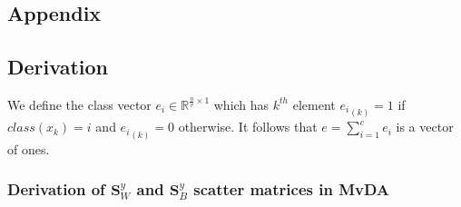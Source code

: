 
\cleardoublepage
{}
\ohead[]{\pagemark}
\begin{appendix}
\chapter{Appendix}

\section{Derivation}\label{app:derivation}

We define the class vector $e_i \in \mathbb{R}^{\frac{n}{v}\times 1}$ which has $k^{th}$ element ${e_i}_{(k)} = 1$ if $class(x_k) = i$ and ${e_i}_{(k)} = 0$ otherwise.
It follows that $e = \sum_{i=1}^{c}e_i$ is a vector of ones.

\subsection{Derivation of \texorpdfstring{$\boldsymbol{S}^y_W$}{intra-class} and \texorpdfstring{$\boldsymbol{S}^y_B$}{inter-class} scatter matrices in MvDA} \label{subsec:derivation_mvda}


\end{appendix}
